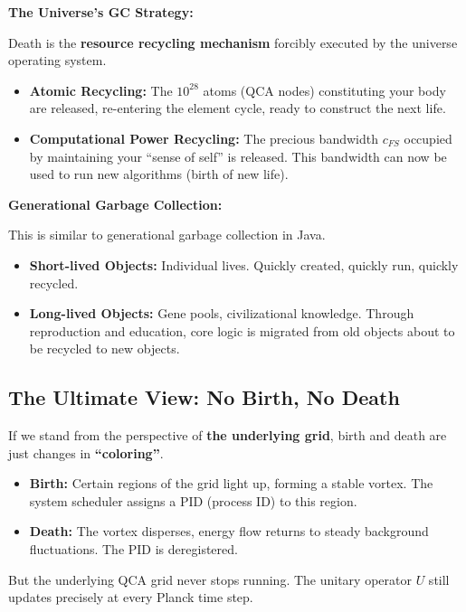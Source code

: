\documentclass[11pt,a4paper,twoside]{book}
\begin{document}
\textbf{The Universe's GC Strategy:}

Death is the \textbf{resource recycling mechanism} forcibly executed by the universe operating system.

\begin{itemize}
\item \textbf{Atomic Recycling:} The \textbf{$10^{28}$} atoms (QCA nodes) constituting your body are released, re-entering the element cycle, ready to construct the next life.

\item \textbf{Computational Power Recycling:} The precious bandwidth \textbf{$c_{FS}$} occupied by maintaining your ``sense of self'' is released. This bandwidth can now be used to run new algorithms (birth of new life).
\end{itemize}

\textbf{Generational Garbage Collection:}

This is similar to generational garbage collection in Java.

\begin{itemize}
\item \textbf{Short-lived Objects:} Individual lives. Quickly created, quickly run, quickly recycled.

\item \textbf{Long-lived Objects:} Gene pools, civilizational knowledge. Through reproduction and education, core logic is migrated from old objects about to be recycled to new objects.
\end{itemize}

\subsection{The Ultimate View: No Birth, No Death}

If we stand from the perspective of \textbf{the underlying grid}, birth and death are just changes in \textbf{``coloring''}.

\begin{itemize}
\item \textbf{Birth:} Certain regions of the grid light up, forming a stable vortex. The system scheduler assigns a PID (process ID) to this region.

\item \textbf{Death:} The vortex disperses, energy flow returns to steady background fluctuations. The PID is deregistered.
\end{itemize}

But the underlying QCA grid never stops running. The unitary operator \textbf{$U$} still updates precisely at every Planck time step.
\end{document}
